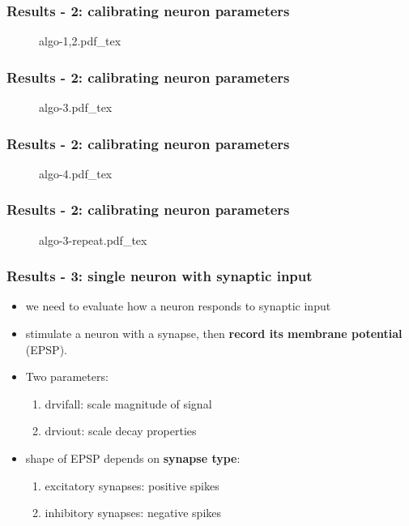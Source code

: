 \documentclass{beamer}
\newcommand{\incfig}[1]{
    \def\svgwidth{\columnwidth}
    {#1.pdf_tex}
}
\begin{document}
\begin{frame}
    \frametitle{Results - 2: calibrating neuron parameters}
    \begin{figure}
        \incfig{algo-1,2}
    \end{figure}
\end{frame}

\begin{frame}
    \frametitle{Results - 2: calibrating neuron parameters}
    \begin{figure}
        \incfig{algo-3}
    \end{figure}
\end{frame}

\begin{frame}
    \frametitle{Results - 2: calibrating neuron parameters}
    \begin{figure}
        \incfig{algo-4}
    \end{figure}
\end{frame}

\begin{frame}
    \frametitle{Results - 2: calibrating neuron parameters}
    \begin{figure}
        \incfig{algo-3-repeat}
    \end{figure}
\end{frame}

\begin{frame}
    \frametitle{Results - 3: single neuron with synaptic input}
    \begin{itemize}
    		\item we need to evaluate how a neuron responds to synaptic input
    		\item stimulate a neuron with a synapse,  then \textbf{record its membrane
    		potential} (EPSP).
    		\item Two parameters:
    		\begin{enumerate}
    			\item drvifall: scale magnitude of signal
    			\item drviout: scale decay properties
		\end{enumerate}
		\item shape of EPSP depends on \textbf{synapse type}:
		\begin{enumerate}
			\item excitatory synapses: positive spikes
			\item inhibitory synapses: negative spikes
		\end{enumerate}
    \end{itemize}
\end{frame}
\end{document}
